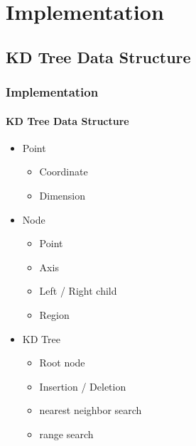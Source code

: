 \documentclass[
	12pt, %
	aspectratio=169, %
]{beamer}
\begin{document}

\section{Implementation}

\subsection{KD Tree Data Structure}

\begin{frame}
	\frametitle{Implementation}
	\framesubtitle{KD Tree Data Structure}

	\begin{itemize}
		\item Point
		\begin{itemize}
			\item Coordinate
			\item Dimension
		\end{itemize}
		\item Node
		\begin{itemize}
			\item Point
			\item Axis
			\item Left / Right child
			\item Region
		\end{itemize}
		\item KD Tree
		\begin{itemize}
			\item Root node
			\item Insertion / Deletion
			\item nearest neighbor search
			\item range search
		\end{itemize}
	\end{itemize}
\end{frame}

\end{document}
